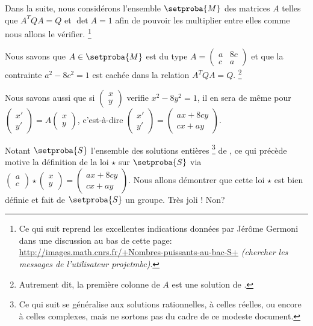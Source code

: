 Dans la suite, nous considérons l'ensemble $\setproba{M}$ des matrices $A$ telles que $A^T Q A = Q$ et $\det A = 1$ afin de pouvoir les multiplier entre elles comme nous allons le vérifier.%
\footnote{
    Ce qui suit reprend les excellentes indications données par Jérôme Germoni dans une discussion au bas de cette page:
\url{http://images.math.cnrs.fr/+Nombres-puissants-au-bac-S+}
\textit{(chercher les messages de l'utilisateur projetmbc)}.
}


\medskip

Nous savons que $A \in \setproba{M}$ est du type
$A
=
\begin{pmatrix}
  a & 8c \\
  c & a
\end{pmatrix}$
et que la contrainte $a^2 - 8c^2 = 1$ est cachée dans la relation $A^T Q A = Q$.%
\footnote{
    Autrement dit, la première colonne de $A$ est une solution de \ED.
}


\medskip

Nous savons aussi que si
$\begin{pmatrix}
  x \\
  y
\end{pmatrix}$
verifie $x^2 - 8 y^2 = 1$, il en sera de même pour
$\begin{pmatrix}
  x' \\
  y'
\end{pmatrix}
=
A
\begin{pmatrix}
  x \\
  y
\end{pmatrix}$,
c'est-à-dire
$\begin{pmatrix}
  x' \\
  y'
\end{pmatrix}
=
\begin{pmatrix}
  a x + 8c y \\
  c x + a y
\end{pmatrix}$.


\bigskip

Notant $\setproba{S}$ l'ensemble des solutions entières
\footnote{
	Ce qui suit se généralise aux solutions rationnelles, à celles réelles, ou encore à celles complexes, mais ne sortons pas du cadre de ce modeste document.
}
de \ED, ce qui précède motive la définition de la loi $\star$ sur $\setproba{S}$ via
$\begin{pmatrix}
  a \\
  c
\end{pmatrix}
\star
\begin{pmatrix}
  x \\
  y
\end{pmatrix}
=
\begin{pmatrix}
  a x + 8c y \\
  c x + a y
\end{pmatrix}$.
Nous allons démontrer que cette loi $\star$ est bien définie et fait de $\setproba{S}$ un groupe. Très joli ! Non?


